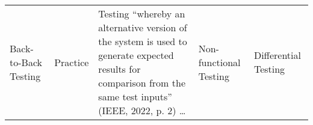 \begin{table}[hbtp!]
\begin{tabularx}{\linewidth}{|m{1.8cm}|>{\raggedright\arraybackslash}m{3.5cm}|>{\raggedright\arraybackslash}X|>{\raggedright\arraybackslash}m{4.25cm}|>{\raggedright\arraybackslash}m{4.25cm}|}
        Back-to-Back Testing & Practice \citep[p.~22]{IEEE2022}                                          & Testing ``whereby an alternative version of the system is used to generate expected results for comparison from the same test inputs'' \citep[p.~2]{IEEE2022} (IEEE, 2022, p. 2) \dots{}                                               & Non-functional Testing \citep[p.~5\=/9]{SWEBOK2024}                                             & Differential Testing \citep[p.~2]{IEEE2022}                                                                                    \\[1.5cm]

\end{tabularx}
\end{table}

